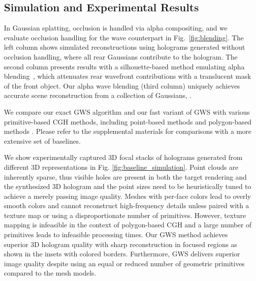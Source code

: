 \subsection{Simulation and Experimental Results}

In Gaussian splatting, occlusion is handled via alpha compositing, and we evaluate occlusion handling for the wave counterpart in Fig.~\ref{fig:blending}. The left column shows simulated reconstructions using holograms generated without occlusion handling, where all rear Gaussians contribute to the hologram. The second column presents results with a silhouette-based method emulating alpha blending~\cite{matsushima2020introduction}, which attenuates rear wavefront contributions with a translucent mask of the front object. Our alpha wave blending (third column) uniquely achieves accurate scene reconstruction from a collection of Gaussians, .

 We compare our exact GWS algorithm and our fast variant of GWS with various primitive-based CGH methods, including point-based methods \cite{chen2009computer} and polygon-based methods \cite{matsushima2014silhouette, matsushima2009extremely}. Please refer to the supplemental materials for comparisons with a more extensive set of baselines.

We show experimentally captured 3D focal stacks of holograms generated from different 3D representations in Fig. \ref{fig:baseline_simulation}. Point clouds are inherently sparse, thus visible holes are present in both the target rendering and the synthesized 3D hologram and the point sizes need to be heuristically tuned to achieve a merely passing image quality. Meshes with per-face colors lead to overly smooth colors and cannot reconstruct high-frequency details unless paired with a texture map or using a disproportionate number of primitives. However, texture mapping is infeasible in the context of polygon-based CGH and a large number of primitives leads to infeasible processing times. Our GWS method achieves superior 3D hologram quality with sharp reconstruction in focused regions as shown in the insets with colored borders. Furthermore, GWS delivers superior image quality despite using an equal or reduced number of geometric primitives compared to the mesh models.

